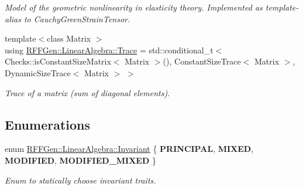 \begin{DoxyCompactItemize}
\begin{DoxyCompactList}\small\item\em Model of the geometric nonlinearity in elasticity theory. Implemented as template-\/alias to Cauchy\-Green\-Strain\-Tensor. \end{DoxyCompactList}\item 
\hypertarget{group__LinearAlgebraGroup_ga9f914d8c58f875d06214ca0d46b3c6cb}{{\footnotesize template$<$class Matrix $>$ }\\using \hyperlink{group__LinearAlgebraGroup_ga9f914d8c58f875d06214ca0d46b3c6cb}{R\-F\-F\-Gen\-::\-Linear\-Algebra\-::\-Trace} = std\-::conditional\-\_\-t$<$ Checks\-::is\-Constant\-Size\-Matrix$<$ Matrix $>$(), Constant\-Size\-Trace$<$ Matrix $>$, Dynamic\-Size\-Trace$<$ Matrix $>$ $>$}\label{group__LinearAlgebraGroup_ga9f914d8c58f875d06214ca0d46b3c6cb}

\begin{DoxyCompactList}\small\item\em Trace of a matrix (sum of diagonal elements). \end{DoxyCompactList}\end{DoxyCompactItemize}
\subsection*{Enumerations}
\begin{DoxyCompactItemize}
\item 
enum \hyperlink{group__LinearAlgebraGroup_gaddcbe266c25a46f729eb8b89841467d9}{R\-F\-F\-Gen\-::\-Linear\-Algebra\-::\-Invariant} \{ {\bfseries P\-R\-I\-N\-C\-I\-P\-A\-L}, 
{\bfseries M\-I\-X\-E\-D}, 
{\bfseries M\-O\-D\-I\-F\-I\-E\-D}, 
{\bfseries M\-O\-D\-I\-F\-I\-E\-D\-\_\-\-M\-I\-X\-E\-D}
 \}
\begin{DoxyCompactList}\small\item\em Enum to statically choose invariant traits. \end{DoxyCompactList}\end{DoxyCompactItemize}
